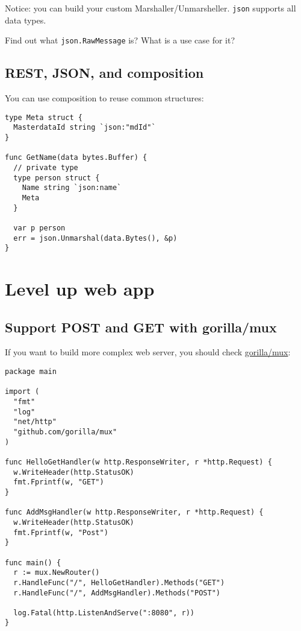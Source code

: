 \documentclass[11pt, letterpaper]{article}
\begin{document}
Notice: you can build your custom Marshaller/Unmarsheller. \verb|json| supports all data types.

\bigskip

Find out what \verb|json.RawMessage| is? What is a use case for it?


\subsection{{\small REST}, {\small JSON}, and composition}

You can use composition to reuse common structures:

\begin{verbatim}
type Meta struct {
  MasterdataId string `json:"mdId"`
}

func GetName(data bytes.Buffer) {
  // private type
  type person struct {
    Name string `json:name`
    Meta
  }

  var p person
  err = json.Unmarshal(data.Bytes(), &p)
}
\end{verbatim}

\section{Level up web app}

\subsection{Support {\small POST} and {\small GET} with gorilla/mux}

If you want to build more complex web server, you should check \href{https://github.com/gorilla/mux}{gorilla/mux}:

\begin{verbatim}
package main

import (
  "fmt"
  "log"
  "net/http"
  "github.com/gorilla/mux"
)

func HelloGetHandler(w http.ResponseWriter, r *http.Request) {
  w.WriteHeader(http.StatusOK)
  fmt.Fprintf(w, "GET")
}

func AddMsgHandler(w http.ResponseWriter, r *http.Request) {
  w.WriteHeader(http.StatusOK)
  fmt.Fprintf(w, "Post")
}

func main() {
  r := mux.NewRouter()
  r.HandleFunc("/", HelloGetHandler).Methods("GET")
  r.HandleFunc("/", AddMsgHandler).Methods("POST")

  log.Fatal(http.ListenAndServe(":8080", r))
}
\end{verbatim}
\end{document}
